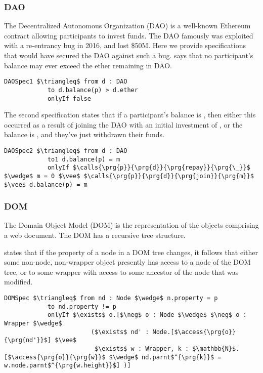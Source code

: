 \subsubsection{DAO}
The Decentralized Autonomous Organization (DAO) is a well-known Ethereum contract allowing 
participants to invest funds. The DAO famously was exploited with a re-entrancy bug in 2016, 
and lost \$50M. Here we provide specifications that would have secured the DAO against such a 
bug.  says that no participant's balance may ever exceed the ether remaining 
in DAO.
\begin{lstlisting}[language = Chainmail, mathescape=true, frame=lines]
DAOSpec1 $\triangleq$ from d : DAO
            to d.balance(p) > d.ether
            onlyIf false
\end{lstlisting}
The second specification  states that if a participant's balance is , then 
either this occurred as a result of joining the DAO with an initial investment of , or the
balance is , and they've just withdrawn their funds.
\begin{lstlisting}[language = Chainmail, mathescape=true, frame=lines]
DAOSpec2 $\triangleq$ from d : DAO
            to1 d.balance(p) = m
            onlyIf $\calls{\prg{p}}{\prg{d}}{\prg{repay}}{\prg{\_}}$ $\wedge$ m = 0 $\vee$ $\calls{\prg{p}}{\prg{d}}{\prg{join}}{\prg{m}}$ $\vee$ d.balance(p) = m
\end{lstlisting}

\subsubsection{DOM}
The Domain Object Model (DOM) is the representation of the objects comprising a web document.
The DOM has a recursive tree structure.

 states that if the property of a node in a DOM tree changes,
it follows that either some non-node, non-wrapper object presently has 
access to a node of the DOM tree, or to some wrapper with access to some 
ancestor of the node that was modified.
\begin{lstlisting}[language = Chainmail, mathescape=true, frame=lines]
DOMSpec $\triangleq$ from nd : Node $\wedge$ n.property = p
            to nd.property != p
            onlyIf $\exists$ o.[$\neg$ o : Node $\wedge$ $\neg$ o : Wrapper $\wedge$ 
                        ($\exists$ nd' : Node.[$\access{\prg{o}}{\prg{nd'}}$] $\vee$ 
                         $\exists$ w : Wrapper, k : $\mathbb{N}$.[$\access{\prg{o}}{\prg{w}}$ $\wedge$ nd.parnt$^{\prg{k}}$ = w.node.parnt$^{\prg{w.height}}$] )]
\end{lstlisting}
